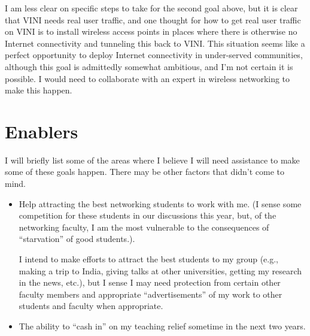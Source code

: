 \begin{sloppypar}
I am less clear on specific steps to take for the second goal above, but
it is clear that VINI needs real user traffic, and one thought for how
to get real user traffic on VINI is to install wireless access points in
places where there is otherwise no Internet connectivity and tunneling
this back to VINI.  This situation seems like a perfect opportunity to
deploy Internet connectivity in under-served communities, although this
goal is admittedly somewhat ambitious, and I'm not certain it is
possible.  I would need to collaborate with an expert in wireless
networking to make this happen.

\section*{Enablers}

I will briefly list some of the areas where I believe I will need
assistance to make some of these goals happen.  There may be other
factors that didn't come to mind.

\begin{itemize}
\itemsep=-1pt
\item Help attracting the best networking students to work with me.  (I
  sense some competition for these students in our discussions this
  year, but, of the networking faculty, I am the most vulnerable to the
  consequences of ``starvation'' of good students.).  

  I intend to make efforts to attract the best students to my group
  (e.g., making a trip to India, giving talks at other universities,
  getting my research in the news, etc.), but I sense I may need
  protection from certain other faculty members and appropriate
  ``advertisements'' of my work to other students and faculty when
  appropriate.

\item The ability to ``cash in'' on my teaching relief sometime in the
  next two years.
\end{itemize}

\end{sloppypar}